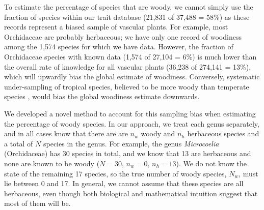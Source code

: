 \documentclass[a4paper,12pt]{article}
\begin{document}
To estimate the percentage of species that are woody, we cannot simply
use the fraction of species within our trait database (21,831 of
37,488 = 58\%) as these records represent a biased sample of vascular
plants.
For example, most Orchidaceae are probably herbaceous; we have only
one record of woodiness among the 1,574 species for which we have
data.
However, the fraction of Orchidaceae species with known data (1,574 of
27,104 = 6\%)
is much lower than the overall rate of knowledge for all vascular
plants (36,238 of 274,141 = 13\%), which will upwardly bias the global
estimate of woodiness.
%
Conversely, systematic under-sampling of tropical species, believed to
be more woody than temperate species \citep{Molesheihgt}, would bias
the global woodiness estimate downwards.


We developed a novel method to account for this sampling bias when
estimating the percentage of woody species.  In our approach, we treat
each genus separately, and in all cases know that there are are $n_w$
woody and $n_h$ herbaceous species and a total of $N$ species in the genus.
%
For example, the genus \textit{Microcoelia} (Orchidaceae) has 30
species in total, and we know that 13 are herbaceous and none are
known to be woody ($N = 30$, $n_w = 0$, $n_h = 13$). We do not know
the state of the remaining 17 species, so the true number of woody
species, $N_w$, must lie between 0 and 17. In general, we cannot
assume that these species are all herbaceous, even though both
biological and mathematical intuition suggest that most of them will
be.
\end{document}
